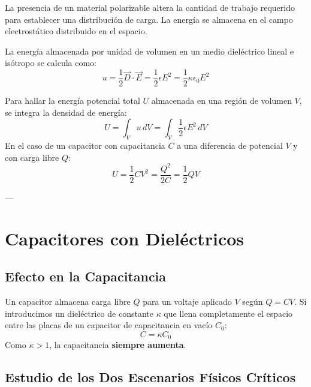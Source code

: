 \documentclass[12pt, a4paper]{article}
\begin{document}
La presencia de un material polarizable altera la cantidad de trabajo requerido para establecer una distribución de carga. La energía se almacena en el campo electrostático distribuido en el espacio.

\begin{definicion}
La energía almacenada por unidad de volumen en un medio dieléctrico lineal e isótropo se calcula como:
\begin{equation}
    u = \frac{1}{2} \vec{D} \cdot \vec{E} = \frac{1}{2} \epsilon E^2 = \frac{1}{2} \kappa \epsilon_0 E^2
\end{equation}
\end{definicion}

Para hallar la energía potencial total $U$ almacenada en una región de volumen $V$, se integra la densidad de energía:
\begin{equation}
    U = \int_V u\, dV = \int_V \frac{1}{2} \epsilon E^2\, dV
\end{equation}
En el caso de un capacitor con capacitancia $C$ a una diferencia de potencial $V$ y con carga libre $Q$:
\begin{equation}
    U = \frac{1}{2} C V^2 = \frac{Q^2}{2C} = \frac{1}{2} Q V
\end{equation}

---

\section{Capacitores con Dieléctricos}

\subsection{Efecto en la Capacitancia}
Un capacitor almacena carga libre $Q$ para un voltaje aplicado $V$ según $Q = C V$. Si introducimos un dieléctrico de constante $\kappa$ que llena completamente el espacio entre las placas de un capacitor de capacitancia en vacío $C_0$:
\begin{equation}
    C = \kappa C_0
\end{equation}
Como $\kappa > 1$, la capacitancia \textbf{siempre aumenta}.

\subsection{Estudio de los Dos Escenarios Físicos Críticos}
\end{document}
